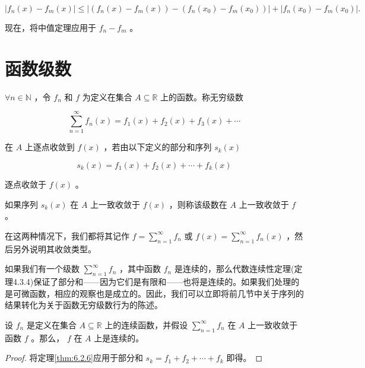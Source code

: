 \[
\left| {{f}_{n}\left( x\right)  - {f}_{m}\left( x\right) }\right|  \leq  \left| {\left( {{f}_{n}\left( x\right)  - {f}_{m}\left( x\right) }\right)  - \left( {{f}_{n}\left( {x}_{0}\right)  - {f}_{m}\left( {x}_{0}\right) }\right) }\right|  + \left| {{f}_{n}\left( {x}_{0}\right)  - {f}_{m}\left( {x}_{0}\right) }\right| .
\]

现在，将中值定理应用于 \({f}_{n} - {f}_{m}\) 。

\section{函数级数}
\label{sec:6.4}
\begin{Def}
 \(\forall n \in  \mathbb{N}\) ，令 \({f}_{n}\) 和 \(f\) 为定义在集合 \(A \subseteq  \mathbb{R}\) 上的函数。称无穷级数

\[
\mathop{\sum }\limits_{{n = 1}}^{\infty }{f}_{n}\left( x\right)  = {f}_{1}\left( x\right)  + {f}_{2}\left( x\right)  + {f}_{3}\left( x\right)  + \cdots
\]

在 \(A\) 上逐点收敛到 \(f\left( x\right)\) ，若由以下定义的部分和序列 \({s}_{k}\left( x\right)\)

\[
{s}_{k}\left( x\right)  = {f}_{1}\left( x\right)  + {f}_{2}\left( x\right)  + \cdots  + {f}_{k}\left( x\right)
\]

逐点收敛于 \(f\left( x\right)\) 。

如果序列 \({s}_{k}\left( x\right)\) 在 \(A\) 上一致收敛于 \(f\left( x\right)\) ，则称该级数在 \(A\) 上一致收敛于 \(f\) 。

在这两种情况下，我们都将其记作 \(f = \mathop{\sum }\limits_{{n = 1}}^{\infty }{f}_{n}\) 或 \(f\left( x\right)  = \mathop{\sum }\limits_{{n = 1}}^{\infty }{f}_{n}\left( x\right)\) ，然后另外说明其收敛类型。
\end{Def}


如果我们有一个级数 \(\mathop{\sum }\limits_{{n = 1}}^{\infty }{f}_{n}\) ，其中函数 \({f}_{n}\) 是连续的，那么代数连续性定理(定理4.3.4)保证了部分和——因为它们是有限和——也将是连续的。如果我们处理的是可微函数，相应的观察也是成立的。因此，我们可以立即将前几节中关于序列的结果转化为关于函数无穷级数行为的陈述。


\begin{Thm}
  设 \({f}_{n}\) 是定义在集合 \(A \subseteq  \mathbb{R}\) 上的连续函数，并假设 \(\mathop{\sum }\limits_{{n = 1}}^{\infty }{f}_{n}\) 在 \(A\) 上一致收敛于函数 \(f\) 。那么， \(f\) 在 \(A\) 上是连续的。
\end{Thm}

\begin{proof}
  将定理\ref{thm:6.2.6}应用于部分和 \({s}_{k} = {f}_{1} + {f}_{2} + \cdots  + {f}_{k}\) 即得。
\end{proof}


